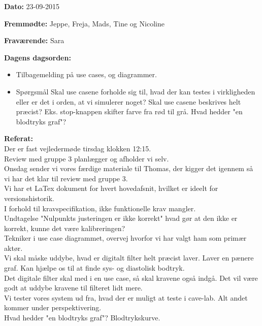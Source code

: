 \textbf{Dato:} 23-09-2015

\textbf{Fremmødte:} Jeppe, Freja, Mads, Tine og Nicoline

\textbf{Fraværende:} Sara

\textbf{Dagens dagsorden:}
\begin{itemize}
	\item Tilbagemelding på use cases, og diagrammer.
	\item Spørgsmål
	\subitem Skal use casene forholde sig til, hvad der kan testes i virkligheden eller er det i orden, at vi simulerer noget?
	\subitem Skal use casene beskrives helt præcist? Eks. stop-knappen skifter farve fra rød til grå.
	\subitem Hvad hedder "en blodtryks graf"?\\
\end{itemize}

\textbf{Referat:}
\\Der er fast vejledermøde tirsdag klokken 12:15.
\\Review med gruppe 3 planlægger og afholder vi selv.
\\Onsdag sender vi vores færdige materiale til Thomas, der kigger det igennem så vi har det klar til review med gruppe 3.
\\Vi har et LaTex dokument for hvert hovedafsnit, hvilket er ideelt for versionshistorik.
\\I forhold til kravspecifikation, ikke funktionelle krav mangler.
\\Undtagelse "Nulpunkts justeringen er ikke korrekt" hvad gør at den ikke er korrekt, kunne det være kalibreringen?
\\Tekniker i use case diagrammet, overvej hvorfor vi har valgt ham som primær aktør.
\\Vi skal måske uddybe, hvad er digitalt filter helt præcist laver. Laver en pænere graf. Kan hjælpe os til at finde sys- og diastolisk bodtryk.
\\Det digitale filter skal med i en use case, så skal kravene også indgå. Det vil være godt at uddybe kravene til filteret lidt mere.
\\Vi tester vores system ud fra, hvad der er muligt at teste i cave-lab. Alt andet kommer under perspektivering. 
\\Hvad hedder "en blodtryks graf"? Blodtrykskurve.




